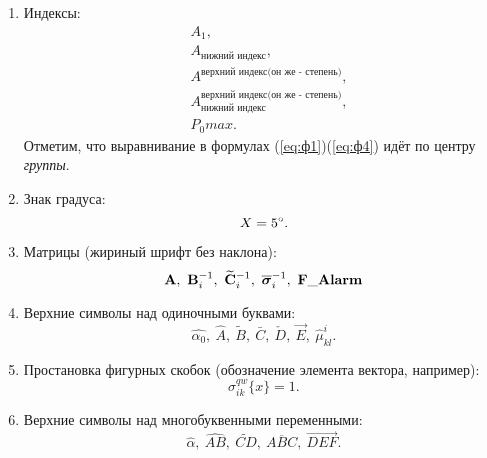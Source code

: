 \begin{enumerate}
\item Индексы:
{\zerodisplayskips
	\begin{align}
	& A_1, \label{eq:ф1}\\
	& A_{\text{нижний индекс}}, \label{eq:ф2}\\
	& A^{\text{верхний индекс(он же - степень)}}, \label{eq:ф3}\\
	& A_{\text{нижний индекс}}^{\text{верхний индекс(он же - степень)}}, \label{eq:ф4} \\
	& P_0max. \label{eq:ф55}
	\end{align}	
}%
Отметим, что выравнивание в формулах (\ref{eq:ф1})\ndash (\ref{eq:ф4}) идёт по центру \textit{группы}.
\item Знак градуса:
{\zerodisplayskips
\begin{equation}
X=5\degree.
\end{equation}	
}%
\item Матрицы (жириный шрифт без наклона):
{\zerodisplayskips
\begin{equation}
	\mathbf{A},~\mathbf{B}_i^{-1},~\widetilde{\mathbf{C}}_i^{-1},~\overline{\boldsymbol{\sigma}}_i^{-1},~\mathbf{F\_Alarm}
\end{equation}	
}%
\item Верхние символы над одиночными буквами:	
{\zerodisplayskips
\begin{equation}
	\hat{\alpha_0},~\hat{A},~\tilde{B},~\bar{C},~\check{D},~\vec{E},~\hat{\mu}_{kl}^i.
\end{equation}
}%
\item Простановка фигурных скобок (обозначение элемента вектора, например):	
{\zerodisplayskips
	\begin{equation}
	\sigma_{ik}^{qw}\{ x \}=1.
	\end{equation}
}%
\item Верхние символы над многобуквенными переменными:	
{\zerodisplayskips
	\begin{equation}
	\widehat{\alpha},~\widehat{AB},~\widetilde{CD},~\overline{ABC},~\overrightarrow{DEF}.

\end{equation}}
\end{enumerate}
